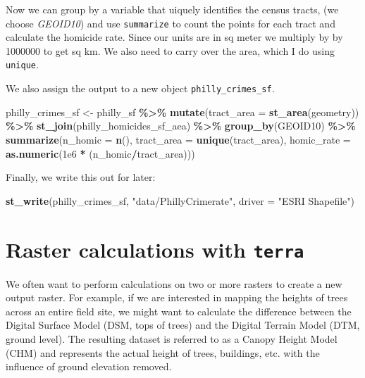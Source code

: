 \documentclass[
]{book}
\newenvironment{Shaded}{\begin{snugshade}}{\end{snugshade}}
\newcommand{\AttributeTok}[1]{\textcolor[rgb]{0.13,0.29,0.53}{#1}}
\newcommand{\FloatTok}[1]{\textcolor[rgb]{0.00,0.00,0.81}{#1}}
\newcommand{\FunctionTok}[1]{\textcolor[rgb]{0.13,0.29,0.53}{\textbf{#1}}}
\newcommand{\NormalTok}[1]{#1}
\newcommand{\OtherTok}[1]{\textcolor[rgb]{0.56,0.35,0.01}{#1}}
\newcommand{\SpecialCharTok}[1]{\textcolor[rgb]{0.81,0.36,0.00}{\textbf{#1}}}
\newcommand{\StringTok}[1]{\textcolor[rgb]{0.31,0.60,0.02}{#1}}
\begin{document}
Now we can group by a variable that uiquely identifies the census tracts, (we choose \emph{GEOID10}) and use \texttt{summarize} to count the points for each tract and calculate the homicide rate. Since our units are in sq meter we multiply by by 1000000 to get sq km. We also need to carry over the area, which I do using \texttt{unique}.

We also assign the output to a new object \texttt{philly\_crimes\_sf}.

\begin{Shaded}
\begin{Highlighting}[]
\NormalTok{philly\_crimes\_sf }\OtherTok{\textless{}{-}}\NormalTok{ philly\_sf }\SpecialCharTok{\%\textgreater{}\%}
      \FunctionTok{mutate}\NormalTok{(}\AttributeTok{tract\_area =} \FunctionTok{st\_area}\NormalTok{(geometry)) }\SpecialCharTok{\%\textgreater{}\%}
      \FunctionTok{st\_join}\NormalTok{(philly\_homicides\_sf\_aea) }\SpecialCharTok{\%\textgreater{}\%}
      \FunctionTok{group\_by}\NormalTok{(GEOID10) }\SpecialCharTok{\%\textgreater{}\%}
      \FunctionTok{summarize}\NormalTok{(}\AttributeTok{n\_homic =} \FunctionTok{n}\NormalTok{(),}
                \AttributeTok{tract\_area =} \FunctionTok{unique}\NormalTok{(tract\_area),}
                \AttributeTok{homic\_rate =} \FunctionTok{as.numeric}\NormalTok{(}\FloatTok{1e6} \SpecialCharTok{*}\NormalTok{ (n\_homic}\SpecialCharTok{/}\NormalTok{tract\_area))) }
\end{Highlighting}
\end{Shaded}

Finally, we write this out for later:

\begin{Shaded}
\begin{Highlighting}[]
\FunctionTok{st\_write}\NormalTok{(philly\_crimes\_sf, }\StringTok{"data/PhillyCrimerate"}\NormalTok{, }\AttributeTok{driver =} \StringTok{"ESRI Shapefile"}\NormalTok{)}
\end{Highlighting}
\end{Shaded}

\hypertarget{raster-calculations-with-terra}{%
\section{\texorpdfstring{Raster calculations with \texttt{terra}}{Raster calculations with terra}}\label{raster-calculations-with-terra}}

We often want to perform calculations on two or more rasters to create a new output raster. For example, if we are interested in mapping the heights of trees across an entire field site, we might want to calculate the difference between the Digital Surface Model (DSM, tops of trees) and the Digital Terrain Model (DTM, ground level). The resulting dataset is referred to as a Canopy Height Model (CHM) and represents the actual height of trees, buildings, etc. with the influence of ground elevation removed.
\end{document}
